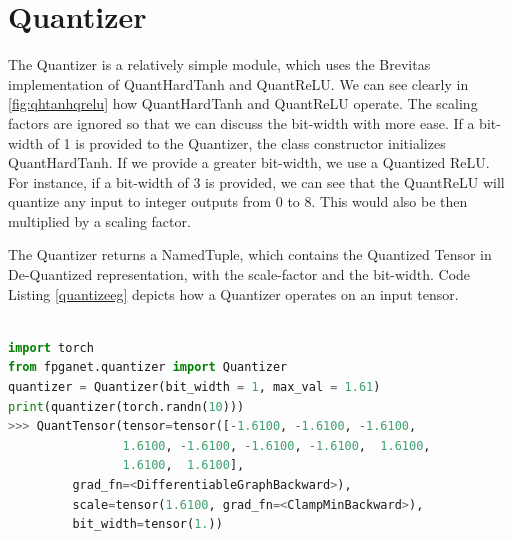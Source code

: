 \section{Quantizer}
The Quantizer is a relatively simple module, which uses the Brevitas implementation of QuantHardTanh and QuantReLU. We can see clearly in \cref{fig:qhtanhqrelu} how QuantHardTanh and QuantReLU operate. The scaling factors are ignored so that we can discuss the bit-width with more ease.
If a bit-width of 1 is provided to the Quantizer, the class constructor initializes QuantHardTanh. If we provide a greater bit-width, we use a Quantized ReLU. For instance, if a bit-width of $3$ is provided, we can see that the QuantReLU will quantize any input to integer outputs from $0$ to $8$. This would also be then multiplied by a scaling factor. 
    

The Quantizer returns a NamedTuple, which contains the Quantized Tensor in De-Quantized representation, with the scale-factor and the bit-width. Code Listing \ref{quantizeeg} depicts how a Quantizer operates on an input tensor.\\\\
\begin{lstlisting}[language=Python, caption=Example of a Quantizer, label=quantizeeg]
import torch
from fpganet.quantizer import Quantizer
quantizer = Quantizer(bit_width = 1, max_val = 1.61)
print(quantizer(torch.randn(10)))
>>> QuantTensor(tensor=tensor([-1.6100, -1.6100, -1.6100,  
                1.6100, -1.6100, -1.6100, -1.6100,  1.6100,
                1.6100,  1.6100],
         grad_fn=<DifferentiableGraphBackward>),    
         scale=tensor(1.6100, grad_fn=<ClampMinBackward>), 
         bit_width=tensor(1.))
\end{lstlisting}

